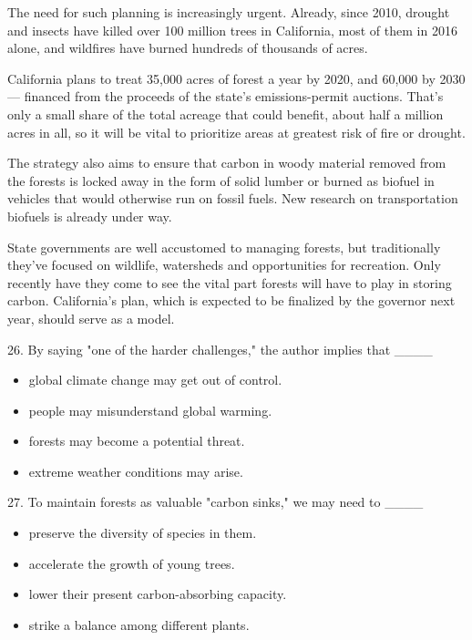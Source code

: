 \documentclass[UTF8,11pt]{ctexart}
\begin{document}
The need for such planning is increasingly urgent. Already, since 2010, drought and insects have killed over 100 million trees in California, most of them in 2016 alone, and wildfires have burned hundreds of thousands of acres.


California plans to treat 35,000 acres of forest a year by 2020, and 60,000 by 2030 — financed from the proceeds of the state's emissions-permit auctions. That's only a small share of the total acreage that could benefit, about half a million acres in all, so it will be vital to prioritize areas at greatest risk of fire or drought.


The strategy also aims to ensure that carbon in woody material removed from the forests is locked away in the form of solid lumber or burned as biofuel in vehicles that would otherwise run on fossil fuels. New research on transportation biofuels is already under way.


State governments are well accustomed to managing forests, but traditionally they've focused on wildlife, watersheds and opportunities for recreation. Only recently have they come to see the vital part forests will have to play in storing carbon. California's plan, which is expected to be finalized by the governor next year, should serve as a model.


26. By saying "one of the harder challenges," the author implies that \_\_\_\_


\begin{itemize}[leftmargin=2em,itemsep=.2em,topsep=.4em]\item[A.] global climate change may get out of control.
\item[B.] people may misunderstand global warming.
\item[C.] forests may become a potential threat.
\item[D.] extreme weather conditions may arise.
\end{itemize}

27. To maintain forests as valuable "carbon sinks," we may need to \_\_\_\_


\begin{itemize}[leftmargin=2em,itemsep=.2em,topsep=.4em]\item[A.] preserve the diversity of species in them.
\item[B.] accelerate the growth of young trees.
\item[C.] lower their present carbon-absorbing capacity.
\item[D.] strike a balance among different plants.
\end{itemize}
\end{document}

